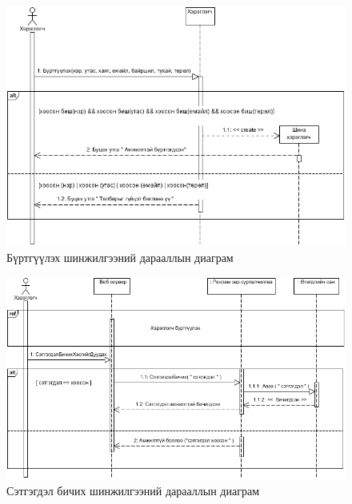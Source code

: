 \begin{figure}
	\centering
	\includegraphics[scale=0.65]{Diagrams/create}
	\caption[Бүртгүүлэх шинжилгээний дарааллын диаграм]{Бүртгүүлэх шинжилгээний дарааллын диаграм}
	\label{text}
\end{figure}

\begin{figure}
	\centering
	\includegraphics[scale=0.6]{Diagrams/write}
	\caption[Сэтгэгдэл бичих шинжилгээний дарааллын диаграм]{Сэтгэгдэл бичих шинжилгээний дарааллын диаграм}
	\label{text}
\end{figure}

